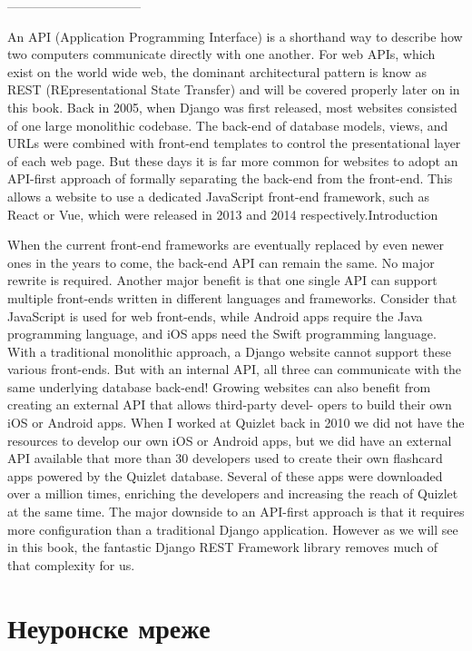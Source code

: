 \documentclass[12pt,oneside]{memoir}
\begin{document}
--------------------------------

An API (Application Programming Interface) is a shorthand way to describe how two computers
communicate directly with one another. For web APIs, which exist on the world wide web, the
dominant architectural pattern is know as REST (REpresentational State Transfer) and will be
covered properly later on in this book.
Back in 2005, when Django was first released, most websites consisted of one large monolithic
codebase. The back-end of database models, views, and URLs were combined with front-end
templates to control the presentational layer of each web page.
But these days it is far more common for websites to adopt an API-first approach of formally
separating the back-end from the front-end. This allows a website to use a dedicated JavaScript
front-end framework, such as React or Vue, which were released in 2013 and 2014 respectively.Introduction

When the current front-end frameworks are eventually replaced by even newer ones in the years
to come, the back-end API can remain the same. No major rewrite is required.
Another major benefit is that one single API can support multiple front-ends written in different
languages and frameworks. Consider that JavaScript is used for web front-ends, while Android
apps require the Java programming language, and iOS apps need the Swift programming
language. With a traditional monolithic approach, a Django website cannot support these various
front-ends. But with an internal API, all three can communicate with the same underlying
database back-end!
Growing websites can also benefit from creating an external API that allows third-party devel-
opers to build their own iOS or Android apps. When I worked at Quizlet back in 2010 we did
not have the resources to develop our own iOS or Android apps, but we did have an external
API available that more than 30 developers used to create their own flashcard apps powered by
the Quizlet database. Several of these apps were downloaded over a million times, enriching the
developers and increasing the reach of Quizlet at the same time.
The major downside to an API-first approach is that it requires more configuration than a
traditional Django application. However as we will see in this book, the fantastic Django REST
Framework library removes much of that complexity for us.




\chapter{Неуронске мреже}
\end{document}
